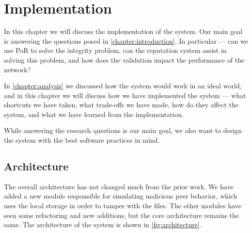 \chapter{Implementation}
\label{chapter:implementation}

In this chapter we will discuss the implementation of the system.
Our main goal is answering the questions posed in \autoref{chapter:introduction}.
In particular --- can we use PoR to solve the integrity problem,
can the reputation system assist in solving this problem,
and how does the validation impact the performance of the network?

In \autoref{chapter:analysis} we discussed how the system would work in an ideal world,
and in this chapter we will discuss how we have implemented the system ---
what shortcuts we have taken, what trade-offs we have made,
how do they affect the system, and what we have learned from the implementation.

While answering the research questions is our main goal,
we also want to design the system with the best software practices in mind.

\section{Architecture}

The overall architecture has not changed much from the prior work.
We have added a new module responsible for simulating malicious peer behavior,
which uses the local storage in order to tamper with the files.
The other modules have seen some refactoring and new additions,
but the core architecture remains the same.
The architecture of the system is shown in \autoref{fig:architecture}.

